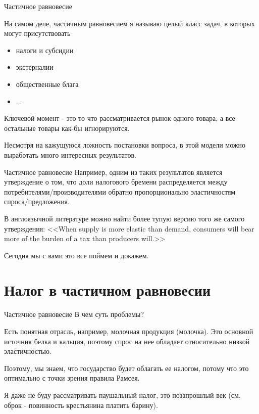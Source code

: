 \documentclass{beamer}
\begin{document}
\begin{frame}{Частичное равновесие}

На самом деле, частичным равновесием я называю целый класс задач, в которых могут присутствовать
\begin{itemize}
  \item налоги и субсидии
  \item экстерналии
  \item общественные блага
  \item ...
\end{itemize}
Ключевой момент - это то что рассматривается \alert{рынок одного товара}, а все остальные товары как-бы игнорируются. 

Несмотря на кажущуюся ложность постановки вопроса, в этой модели можно выработать много интересных результатов.
\end{frame}

\begin{frame}{Частичное равновесие}
Например, одним из таких результатов является утверждение о том, что \alert{доли налогового бремени распределяется между потребителями/производителями обратно пропорционально эластичностям спроса/предложения}. 

В англоязычной литературе можно найти более тупую версию того же самого утверждения: <<When supply is more elastic than demand, consumers will bear more of the burden of a tax than producers will.>>

Сегодня мы с вами это все поймем и докажем.
\end{frame}

\section{Налог в частичном равновесии}

\begin{frame}{Частичное равновесие}
В чем суть проблемы?

Есть понятная отрасль, например, молочная продукция (молочка). Это основной источник белка и кальция, поэтому спрос на нее обладает относительно низкой эластичностью.

Поэтому, мы знаем, что государство будет облагать ее налогом, потому что это оптимально с точки зрения правила Рамсея.

Я даже не буду рассматривать паушальный налог, это позапрошлый век (см. оброк - повинность крестьянина платить барину).

\end{frame}
\end{document}
